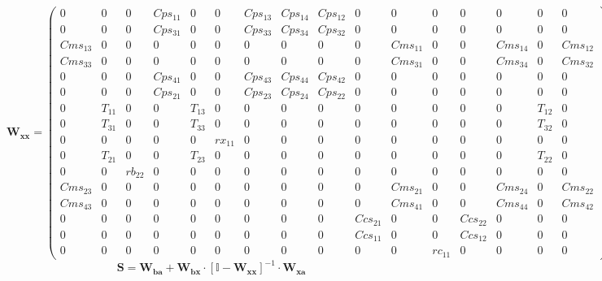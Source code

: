 \[ \mathbf{W_{xx}} = \left(\begin{smallmatrix} 0 & 0 & 0 & Cps_{11} &
0 & 0 & Cps_{13} & Cps_{14} & Cps_{12} & 0 & 0 & 0 & 0 & 0 & 0 & 0 \\
0 & 0 & 0 & Cps_{31} & 0 & 0 & Cps_{33} & Cps_{34} & Cps_{32} & 0 & 0
& 0 & 0 & 0 & 0 & 0 \\ Cms_{13} & 0 & 0 & 0 & 0 & 0 & 0 & 0 & 0 & 0 &
Cms_{11} & 0 & 0 & Cms_{14} & 0 & Cms_{12} \\ Cms_{33} & 0 & 0 & 0 & 0
& 0 & 0 & 0 & 0 & 0 & Cms_{31} & 0 & 0 & Cms_{34} & 0 & Cms_{32} \\ 0
& 0 & 0 & Cps_{41} & 0 & 0 & Cps_{43} & Cps_{44} & Cps_{42} & 0 & 0 &
0 & 0 & 0 & 0 & 0 \\ 0 & 0 & 0 & Cps_{21} & 0 & 0 & Cps_{23} &
Cps_{24} & Cps_{22} & 0 & 0 & 0 & 0 & 0 & 0 & 0 \\ 0 & T_{11} & 0 & 0
& T_{13} & 0 & 0 & 0 & 0 & 0 & 0 & 0 & 0 & 0 & T_{12} & 0 \\ 0 &
T_{31} & 0 & 0 & T_{33} & 0 & 0 & 0 & 0 & 0 & 0 & 0 & 0 & 0 & T_{32} &
0 \\ 0 & 0 & 0 & 0 & 0 & rx_{11} & 0 & 0 & 0 & 0 & 0 & 0 & 0 & 0 & 0 &
0 \\ 0 & T_{21} & 0 & 0 & T_{23} & 0 & 0 & 0 & 0 & 0 & 0 & 0 & 0 & 0 &
T_{22} & 0 \\ 0 & 0 & rb_{22} & 0 & 0 & 0 & 0 & 0 & 0 & 0 & 0 & 0 & 0
& 0 & 0 & 0 \\ Cms_{23} & 0 & 0 & 0 & 0 & 0 & 0 & 0 & 0 & 0 & Cms_{21}
& 0 & 0 & Cms_{24} & 0 & Cms_{22} \\ Cms_{43} & 0 & 0 & 0 & 0 & 0 & 0
& 0 & 0 & 0 & Cms_{41} & 0 & 0 & Cms_{44} & 0 & Cms_{42} \\ 0 & 0 & 0
& 0 & 0 & 0 & 0 & 0 & 0 & Ccs_{21} & 0 & 0 & Ccs_{22} & 0 & 0 & 0 \\ 0
& 0 & 0 & 0 & 0 & 0 & 0 & 0 & 0 & Ccs_{11} & 0 & 0 & Ccs_{12} & 0 & 0
& 0 \\ 0 & 0 & 0 & 0 & 0 & 0 & 0 & 0 & 0 & 0 & 0 & rc_{11} & 0 & 0 & 0
& 0 \end{smallmatrix}\right) \]
\[ \mathbf{S}=\mathbf{W_{ba}}+\mathbf{W_{bx}}\cdot\left[ \mathbb{I}
-\mathbf{W_{xx}}\right]^{-1}\cdot\mathbf{W_{xa}} \]
